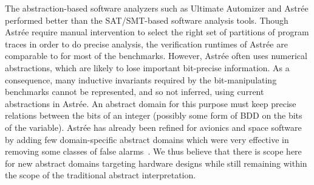 %
The abstraction-based software analyzers such as Ultimate Automizer and Astr{\'e}e 
performed better than the SAT/SMT-based software analysis tools.  Though 
Astr{\'e}e require manual intervention to select the right set of partitions 
of program traces in order to do precise analysis, the verification runtimes 
of Astr{\'e}e are comparable to \ABC for most of the benchmarks.  However, 
Astr{\'e}e often uses numerical abstractions, which are likely to lose 
important bit-precise information.  
%
As a consequence, many inductive invariants required by the bit-manipulating 
benchmarks cannot be represented, and so not inferred, using current abstractions 
in Astr{\'e}e.  An abstract domain for this purpose must keep 
precise relations between the bits of an integer (possibly some 
form of BDD on the bits of the variable).  Astr{\'e}e has already been 
refined for avionics and space software by adding few domain-specific 
abstract domains which were very effective in removing some classes of 
false alarms~\cite{DBLP:journals/ftpl/BertraneCCFMMR15}.  We thus believe 
that there is scope here for new abstract domains targeting hardware 
designs while still remaining within the scope of the traditional abstract 
interpretation. 
%

